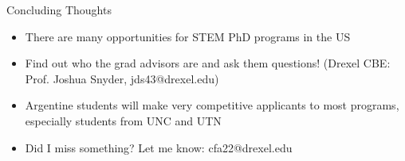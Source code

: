 \begin{frame}[fragile]{Concluding Thoughts}
\begin{itemize}
    \item There are many opportunities for STEM PhD programs in the US
    \item Find out who the grad advisors are and ask them questions! (Drexel CBE: Prof. Joshua Snyder, jds43@drexel.edu)
    \item Argentine students will make very competitive applicants to most programs, especially students from UNC and UTN
    \item Did I miss something?  Let me know: cfa22@drexel.edu
\end{itemize}
\end{frame}

